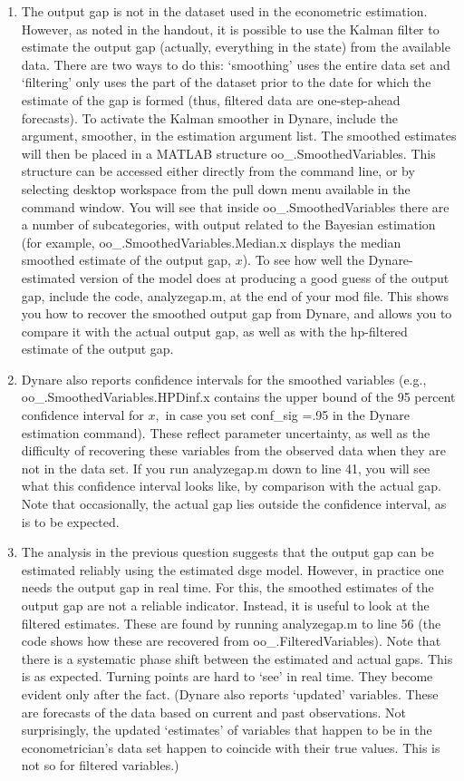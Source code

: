 \begin{enumerate}
\item The output gap is not in the dataset used in the econometric
estimation. However, as noted in the handout, it is possible to use the
Kalman filter to estimate the output gap (actually, everything in the state)
from the available data. There are two ways to do this: `smoothing' uses the
entire data set and `filtering' only uses the part of the dataset prior to
the date for which the estimate of the gap is formed (thus, filtered data
are one-step-ahead forecasts). To activate the Kalman smoother in Dynare,
include the argument, smoother, in the estimation argument list. The
smoothed estimates will then be placed in a MATLAB structure
oo\_.SmoothedVariables. This structure can be accessed either directly from
the command line, or by selecting \TEXTsymbol{>}desktop\TEXTsymbol{>}%
workspace from the pull down menu available in the command window. You will
see that inside oo\_.SmoothedVariables there are a number of subcategories,
with output related to the Bayesian estimation (for example,
oo\_.SmoothedVariables.Median.x displays the median smoothed estimate of the
output gap, $x$). To see how well the Dynare-estimated version of the model
does at producing a good guess of the output gap, include the code,
analyzegap.m, at the end of your mod file. This shows you how to recover the
smoothed output gap from Dynare, and allows you to compare it with the
actual output gap, as well as with the hp-filtered estimate of the output
gap.

\item Dynare also reports confidence intervals for the smoothed variables
(e.g., oo\_.SmoothedVariables.HPDinf.x contains the upper bound of the 95
percent confidence interval for $x,$ in case you set conf\_sig =.95 in the
Dynare estimation command). These reflect parameter uncertainty, as well as
the difficulty of recovering these variables from the observed data when
they are not in the data set. If you run analyzegap.m down to line 41, you
will see what this confidence interval looks like, by comparison with the
actual gap. Note that occasionally, the actual gap lies outside the
confidence interval, as is to be expected.

\item The analysis in the previous question suggests that the output gap can
be estimated reliably using the estimated dsge model. However, in practice
one needs the output gap in real time. For this, the smoothed estimates of
the output gap are not a reliable indicator. Instead, it is useful to look
at the filtered estimates. These are found by running analyzegap.m to line
56 (the code shows how these are recovered from oo\_.FilteredVariables).
Note that there is a systematic phase shift between the estimated and actual
gaps. This is as expected. Turning points are hard to `see' in real time.
They become evident only after the fact. (Dynare also reports `updated'
variables. These are forecasts of the data based on current and past
observations. Not surprisingly, the updated `estimates' of variables that
happen to be in the econometrician's data set happen to coincide with their
true values. This is not so for filtered variables.)


\end{enumerate}
